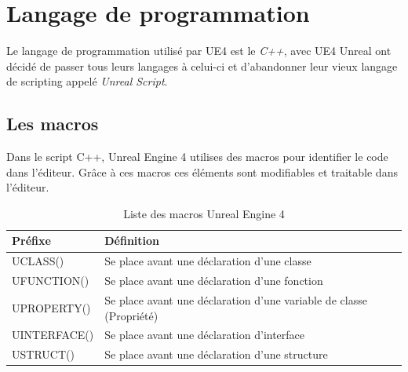\documentclass[11pt, a4paper, oneside]{article}
\begin{document}
\section{Langage de programmation}
Le langage de programmation utilisé par UE4 est le \textit{C++}, avec UE4 Unreal ont décidé de passer tous leurs langages à celui-ci et d'abandonner leur vieux langage de scripting appelé \textit{Unreal Script}.

\subsection{Les macros}
Dans le script C++, Unreal Engine 4 utilises des macros pour identifier le code dans l'éditeur. Grâce à ces macros ces éléments sont modifiables et traitable dans l'éditeur.
\begin{table}[h]
	\begin{center}
		\begin{tabularx}{\textwidth}{ l l }
			\hline
			\textbf{Préfixe} & \textbf{Définition}\\
			\hline
			\hline
			UCLASS() & Se place avant une déclaration d'une classe\\
			UFUNCTION() & Se place avant une déclaration d'une fonction\\
			UPROPERTY() & Se place avant une déclaration d'une variable de classe (Propriété)\\
			UINTERFACE() & Se place avant une déclaration d'interface\\
			USTRUCT() & Se place avant une déclaration d'une structure\\
			\hline
		\end{tabularx}
		\caption{Liste des macros Unreal Engine 4}
		\label{table:macros}
	\end{center}
\end{table}
\end{document}

